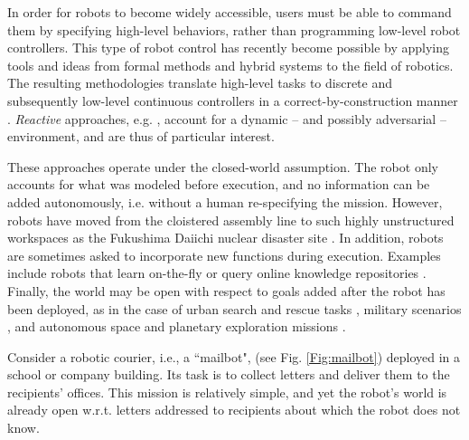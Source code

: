 In order for robots to become widely accessible, users must be able to command them by specifying high-level behaviors, rather than programming low-level robot controllers.
This type of robot control has recently become possible by applying tools and ideas from formal methods and hybrid systems to the field of robotics. The resulting methodologies translate high-level tasks to discrete and subsequently low-level continuous controllers in a correct-by-construction manner \cite{BBEFKP06, KGFP_TRO09, KaramanCDC2009, Wongpiromsarn2010, LaValleRSS2011, BhatiaRAM2011, Belta2013RSS}.
\emph{Reactive} approaches, e.g. \cite{KGFP_TRO09, Wongpiromsarn2010, Belta2013RSS}, account for a dynamic -- and possibly adversarial -- environment, and are thus of particular interest.

These approaches operate under the closed-world assumption. The robot only accounts for what was modeled before execution, and no information can be added autonomously, i.e. without a human re-specifying the mission.
However, robots have moved from the cloistered assembly line to such highly unstructured workspaces as the Fukushima Daiichi nuclear disaster site \cite{Fukushima2011}. 
In addition, robots are sometimes asked to incorporate new functions during execution. 
Examples include 
robots that learn on-the-fly \cite{SaxenaIJRR2012} or query online knowledge repositories \cite{rapyuta2013}. 
Finally, the world may be open with respect to goals added after the robot has been deployed, as in the case of urban search and rescue tasks \cite{MatthiasAI2010}, military scenarios \cite{gda2013}, and autonomous space and planetary exploration missions \cite{spaceXplore2006}. 

\begin{myExample}\label{Ex:mailbot1}
Consider a robotic courier, i.e., a ``mailbot", (see Fig. \ref{Fig:mailbot}) deployed in a school or company building. 
Its task is to collect letters and deliver them to the recipients' offices. 
This mission is relatively simple, and yet the robot's world is already open w.r.t. letters addressed to recipients about which the robot does not know. %
\end{myExample}

